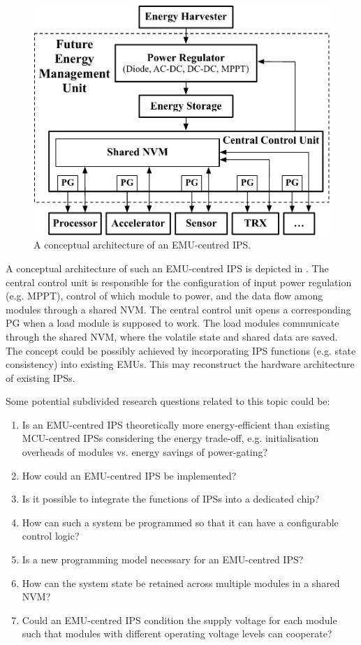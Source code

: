\begin{figure}
    \centering
    \includegraphics[width=0.9\columnwidth]{ch6_conclusion/figures/EMUIPSarch.pdf}
    \caption{A conceptual architecture of an EMU-centred IPS.}
    \label{fig:emuips}
\end{figure}

A conceptual architecture of such an EMU-centred IPS is depicted in .
The central control unit is responsible for the configuration of input power regulation (e.g. MPPT), control of which module to power, and the data flow among modules through a shared NVM. 
The central control unit opens a corresponding PG when a load module is supposed to work.
The load modules communicate through the shared NVM, where the volatile state and shared data are saved. 
The concept could be possibly achieved by incorporating IPS functions (e.g. state consistency) into existing EMUs.
This may reconstruct the hardware architecture of existing IPSs.

Some potential subdivided research questions related to this topic could be:
\begin{enumerate}
    \item Is an EMU-centred IPS theoretically more energy-efficient than existing MCU-centred IPSs considering the energy trade-off, e.g. initialisation overheads of modules vs. energy savings of power-gating?
    \item How could an EMU-centred IPS be implemented?
    \item Is it possible to integrate the functions of IPSs into a dedicated chip?
    \item How can such a system be programmed so that it can have a configurable control logic?
    \item Is a new programming model necessary for an EMU-centred IPS?
    \item How can the system state be retained across multiple modules in a shared NVM?
    \item Could an EMU-centred IPS condition the supply voltage for each module such that modules with different operating voltage levels can cooperate? 
\end{enumerate}

